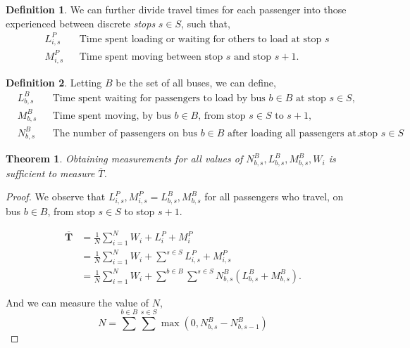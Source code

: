 \documentclass[12pt]{article}
\newtheorem{theorem}{Theorem}
\theoremstyle{definition}
\newtheorem{definition}{Definition}
\begin{document}
\begin{definition}
    \hfill\par\nopagebreak
    We can further divide travel times for each passenger into those
    experienced between discrete \emph{stops} $s \in S$, such that,
    \begin{align*}
        &L^P_{i,s}&
        &\text{Time spent loading or waiting for others to load at stop $s$}\\
        &M^P_{i,s}&
        &\text{Time spent moving between stop $s$ and stop $s+1$}.
    \end{align*}
\end{definition}

\begin{definition}
    \hfill\par\nopagebreak
    Letting $B$ be the set of all buses, we can define,
    \begin{align*}
        &L^B_{b,s}&
        &\text{Time spent waiting for passengers to load by bus $b \in B$ at
        stop $s\in S$},\\
        &M^B_{b,s}&
        &\text{Time spent moving, by bus $b \in B$, from stop $s \in S$ to
        $s+1$},\\
        &N^B_{b,s}&
        &\text{The number of passengers on bus $b \in B$ after loading all
        passengers at stop $s \in S$}.
    \end{align*}
\end{definition}

\begin{theorem}
    Obtaining measurements for all values of $N^B_{b, s}, L^B_{b,s},
    M^B_{b,s}, W_i$ is sufficient to measure $\overline{T}$.
\end{theorem}

\begin{proof}
    We observe that $L^P_{i,s}, M^P_{i,s} = L^B_{b,s}, M^B_{b,s}$ for all
    passengers who travel, on bus $b \in B$, from stop $s \in S$ to stop $s+1$.

    \begin{align*}
        \mathbf \overline{T}
        &= \frac{1}{N}\sum_{i=1}^N W_i + L^P_i + M^P_i\\
        &= \frac{1}{N}\sum_{i=1}^N W_i + \sum^{s \in S}
        L^P_{i,s} + M^P_{i,s}\\
        &= \frac{1}{N}\sum_{i=1}^N W_i + \sum^{b \in B}\sum^{s \in S}
        N^B_{b,s}(L^B_{b,s} + M^B_{b,s}).
    \end{align*}

    And we can measure the value of $N$,
    \[
        N = \sum^{b \in B} \sum^{s \in S}
        \max \left(0, N^B_{b,s} - N^B_{b, s-1}\right)
    \]
\end{proof}
\end{document}
